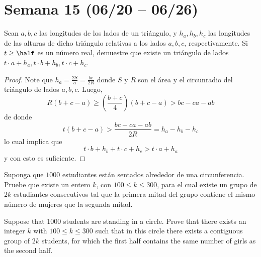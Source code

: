 \section{Semana 15 (06/20 -- 06/26)}


\begin{probEG}
	Sean $a,b,c$ las longitudes de los lados de un triángulo, y $h_a,h_b,h_c$ las longitudes de las alturas de dicho triángulo relativas a los lados $a,b,c$, respectivamente. Si $t\ge\half$ es un número real, demuestre que existe un triángulo de lados $t\cdot a+h_a,t\cdot b+h_b,t\cdot c+h_c$.
\end{probEG}

\begin{proof}
	Note que $h_a=\frac{2S}{a}=\frac{bc}{2R}$ donde $S$ y $R$ son el área y el circunradio del triángulo de lados $a,b,c$. Luego,
	\[R(b+c-a)\ge\left(\frac{b+c}{4}\right)(b+c-a)>bc-ca-ab\]
	de donde
	\[t(b+c-a)>\frac{bc-ca-ab}{2R}=h_a-h_b-h_c\]
	lo cual implica que
	\[t\cdot b+h_b+t\cdot c+h_c>t\cdot a+h_a\]
	y con esto es suficiente.
\end{proof}

\note[Combinatoria]{}

\begin{probEG}[ISL 2011/C2]
	Suponga que $1000$ estudiantes están sentados alrededor de una circunferencia. Pruebe que existe un entero $k$, con $100\le k\le 300$, para el cual existe un grupo de $2k$ estudiantes consecutivos tal que la primera mitad del grupo contiene el mismo número de mujeres que la segunda mitad.
	\begin{hint}
		Suppose that $1000$ students are standing in a circle. Prove that there exists an integer $k$ with $100\le k\le 300$ such that in this circle there exists a contiguous group of $2k$ students, for which the first half contains the same number of girls as the second half.
	\end{hint}
\end{probEG}

